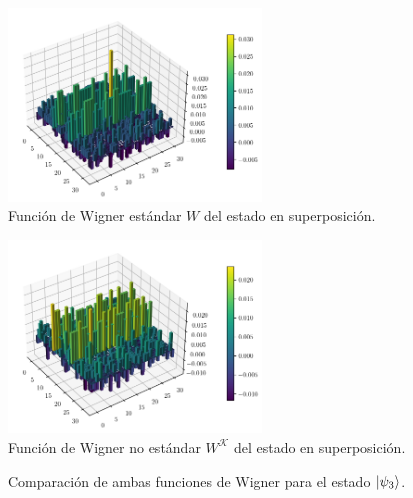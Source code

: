 \documentclass[a4paper]{report}
\begin{document}
  \begin{figure}[ht]
    \centering
    \includegraphics[width=0.6\textwidth]{
    imgs/wigner-standard-2-5-s3.png}
    \caption{ Función de Wigner estándar $W$ del estado en
    superposición.}
    \label{fig:wigner-standard-2-5-s3}
  \end{figure}
  \begin{figure}[ht]
    \centering
    \includegraphics[width=0.6\textwidth]{
    imgs/wigner-kantor-2-5-s3.png}
    \caption{ Función de Wigner no estándar $W^{\mathcal K}$
    del estado en superposición.}
    \label{fig:wigner-kantor-2-5-s3}
  \end{figure}

  \begin{figure}
    \centering
    \quad
    \caption{Comparación de ambas funciones de Wigner para
    el estado $\ket{\psi_3}$.}
    \label{fig:wigner-2-5-s3-heat}
  \end{figure}
\end{document}
